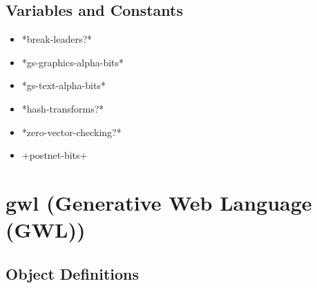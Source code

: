 \documentclass [11pt]{book}
\begin{document}
\subsection{Variables and Constants}

\label{subsec:variablesandconstants}



\begin{itemize}

\item {}*break-leaders?*





\item {}*gs-graphics-alpha-bits*





\item {}*gs-text-alpha-bits*





\item {}*hash-transforms?*





\item {}*zero-vector-checking?*





\item {}+postnet-bits+





\end{itemize}





\section{gwl (Generative Web Language (GWL))}

\label{sec:gwl(generativeweblanguage(gwl))}





\subsection{Object Definitions}

\label{subsec:objectdefinitions}
\end{document}
